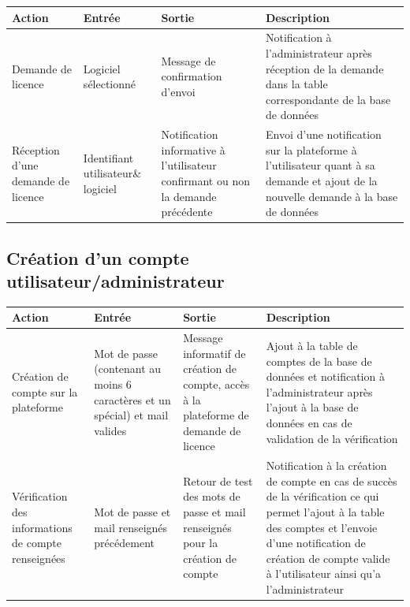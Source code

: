 	\begin{table}[!ht] %
		\small
		\begin{tabular}{ | m{3cm} | m{3cm} | m{3cm} | m{6cm} | } 
			\hline
			\textbf{Action} & \textbf{Entrée} & \textbf{Sortie} & \textbf{Description} \\
			\hline
			Demande de licence & Logiciel sélectionné & Message de confirmation  d'envoi & Notification à l'administrateur après réception de la demande dans la table correspondante de la base de données \\
			\hline
			Réception d'une  demande de  licence & Identifiant utilisateur\& logiciel & Notification informative à l'utilisateur  confirmant ou  non la demande  précédente & Envoi d'une notification sur la plateforme à l'utilisateur quant à sa demande et ajout de la nouvelle demande à la base de données\\
			\hline
		\end{tabular}
	\end{table} 
	
\subsection{Création d'un compte utilisateur/administrateur}

\begin{table}[!ht] %
	\small
	\begin{tabular}{ | m{3cm} | m{3cm} | m{3cm} | m{6cm} | } 
		\hline
		\textbf{Action} & \textbf{Entrée} & \textbf{Sortie} & \textbf{Description} \\
		\hline
			Création de compte sur la  plateforme & Mot de passe (contenant au moins 6 caractères et un spécial) et mail valides & Message informatif de création de compte, accès à la plateforme de demande de licence& Ajout à la table de comptes de la base de données et notification à l'administrateur après l'ajout à la base de données en cas de validation de la vérification\\
		\hline
			Vérification des informations de  compte renseignées & Mot de passe et mail renseignés précédement & Retour de test des mots de passe et mail renseignés pour la création de compte& Notification à la création de compte en cas de succès de la vérification ce qui permet l'ajout à la table des comptes et l'envoie d'une notification de création de compte valide à l'utilisateur ainsi qu'a l'administrateur\\
		\hline
	\end{tabular}
\end{table}

